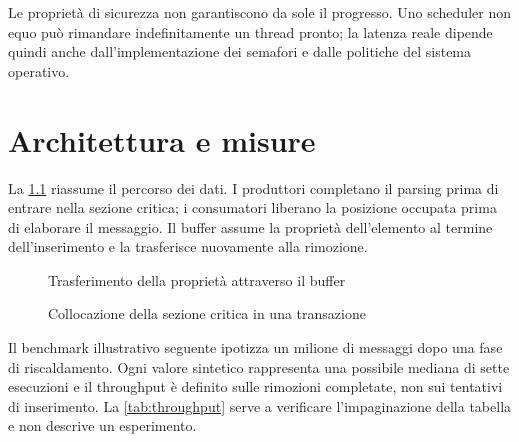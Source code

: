 \documentclass[italian]{../../unipd-notes}
\begin{document}
Le proprietà di sicurezza non garantiscono da sole il progresso. Uno scheduler non equo può rimandare indefinitamente un thread pronto; la latenza reale dipende quindi anche dall'implementazione dei semafori e dalle politiche del sistema operativo.

\chapter{Architettura e misure}

La \cref{fig:architecture} riassume il percorso dei dati. I produttori completano il parsing prima di entrare nella sezione critica; i consumatori liberano la posizione occupata prima di elaborare il messaggio. Il buffer assume la proprietà dell'elemento al termine dell'inserimento e la trasferisce nuovamente alla rimozione.

\begin{figure}[H]
  \centering
  \caption{Trasferimento della proprietà attraverso il buffer}\label{fig:architecture}
\end{figure}

\begin{figure}[H]
  \centering
  \caption{Collocazione della sezione critica in una transazione}\label{fig:timeline}
\end{figure}

Il benchmark illustrativo seguente ipotizza un milione di messaggi dopo una fase di riscaldamento. Ogni valore sintetico rappresenta una possibile mediana di sette esecuzioni e il throughput è definito sulle rimozioni completate, non sui tentativi di inserimento. La \cref{tab:throughput} serve a verificare l'impaginazione della tabella e non descrive un esperimento.
\end{document}
